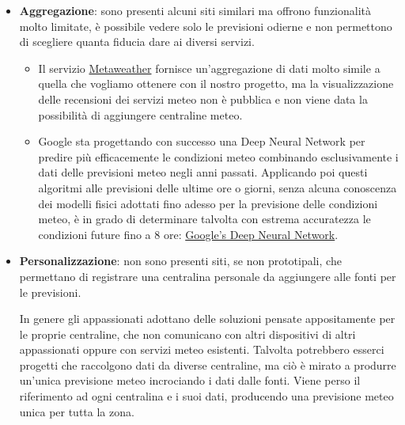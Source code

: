 \begin{itemize}

    \item \textbf{Aggregazione}: sono presenti alcuni siti similari ma offrono funzionalità molto limitate, è possibile vedere solo le previsioni odierne e non permettono di scegliere quanta fiducia dare ai diversi servizi.
    
    \begin{itemize}
    
        \item Il servizio \href{https://www.metaweather.com/it/}{Metaweather} fornisce un'aggregazione di dati molto simile a quella che vogliamo ottenere con il nostro progetto, ma la visualizzazione delle recensioni dei servizi meteo non è pubblica e non viene data la possibilità di aggiungere centraline meteo.
        
        \item Google sta progettando con successo una Deep Neural Network per predire più efficacemente le condizioni meteo combinando esclusivamente i dati delle previsioni meteo negli anni passati. Applicando poi questi algoritmi alle previsioni delle ultime ore o giorni, senza alcuna conoscenza dei modelli fisici adottati fino adesso per la previsione delle condizioni meteo, è in grado di determinare talvolta con estrema accuratezza le condizioni future fino a 8 ore: \href{https://neurohive.io/en/news/google-s-deep-neural-network-makes-detailed-weather-forecasts/}{Google's Deep Neural Network}. 
        
    \end{itemize}
    
    \item \textbf{Personalizzazione}: non sono presenti siti, se non prototipali, che permettano di registrare una centralina personale da aggiungere alle fonti per le previsioni. 
    
    \par In genere gli appassionati adottano delle soluzioni pensate appositamente per le proprie centraline, che non comunicano con altri dispositivi di altri appassionati oppure con servizi meteo esistenti. Talvolta potrebbero esserci progetti che raccolgono dati da diverse centraline, ma ciò è mirato a produrre un'unica previsione meteo incrociando i dati dalle fonti. Viene perso il riferimento ad ogni centralina e i suoi dati, producendo una previsione meteo unica per tutta la zona.
    
\end{itemize}
 

